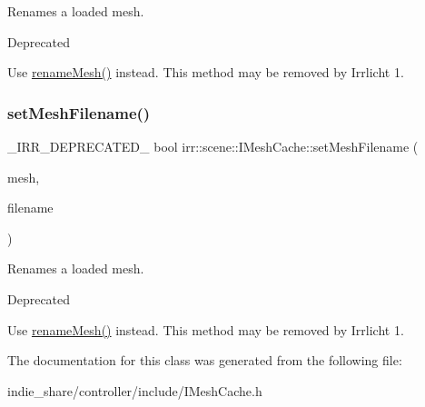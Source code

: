 Renames a loaded mesh. 

\begin{DoxyRefDesc}{Deprecated}
\item[\hyperlink{deprecated__deprecated000012}{Deprecated}]Use \hyperlink{classirr_1_1scene_1_1IMeshCache_a820743b703cdc4362a3dbe6664271bcb}{rename\+Mesh()} instead. This method may be removed by Irrlicht 1. \end{DoxyRefDesc}
\mbox{\label{classirr_1_1scene_1_1IMeshCache_a9b7770a23859ddd045b3c22dfbecbcaf}} 
\subsubsection{\texorpdfstring{set\+Mesh\+Filename()}{setMeshFilename()}\hspace{0.1cm}{\footnotesize\ttfamily [2/2]}}
{\footnotesize\ttfamily \+\_\+\+I\+R\+R\+\_\+\+D\+E\+P\+R\+E\+C\+A\+T\+E\+D\+\_\+ bool irr\+::scene\+::\+I\+Mesh\+Cache\+::set\+Mesh\+Filename (\begin{DoxyParamCaption}\item[{const \hyperlink{classirr_1_1scene_1_1IMesh}{I\+Mesh} $\ast$const}]{mesh,  }\item[{const \hyperlink{namespaceirr_1_1io_ab1bdc45edb3f94d8319c02bc0f840ee1}{io\+::path} \&}]{filename }\end{DoxyParamCaption})\hspace{0.3cm}{\ttfamily [inline]}}



Renames a loaded mesh. 

\begin{DoxyRefDesc}{Deprecated}
\item[\hyperlink{deprecated__deprecated000013}{Deprecated}]Use \hyperlink{classirr_1_1scene_1_1IMeshCache_a820743b703cdc4362a3dbe6664271bcb}{rename\+Mesh()} instead. This method may be removed by Irrlicht 1. \end{DoxyRefDesc}


The documentation for this class was generated from the following file\+:\begin{DoxyCompactItemize}
\item 
indie\+\_\+share/controller/include/I\+Mesh\+Cache.\+h\end{DoxyCompactItemize}
